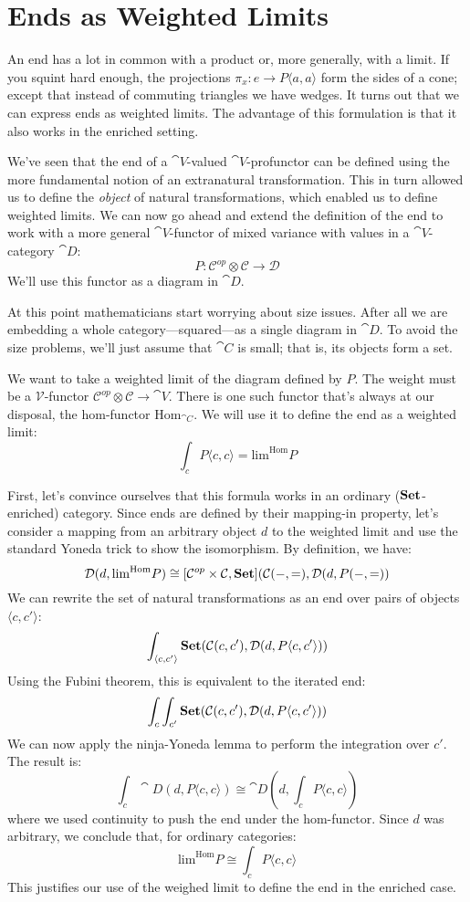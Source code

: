 \documentclass[DaoFP]{subfiles}
\begin{document}
\section{Ends as Weighted Limits}

An end has a lot in common with a product or, more generally, with a limit. If you squint hard enough, the projections $\pi_x \colon e \to P \langle a, a \rangle$ form the sides of a cone; except that instead of commuting triangles we have wedges. It turns out that we can express ends as weighted limits. The advantage of this formulation is that it also works in the enriched setting. 

We've seen that the end of a $\cat V$-valued $\cat V$-profunctor can be defined using the more fundamental notion of an extranatural transformation. This in turn allowed us to define the \emph{object} of natural transformations, which enabled us to define weighted limits. We can now go ahead and extend the definition of the end to work with a more general $\cat V$-functor of mixed variance with values in a $\cat V$-category $\cat D$:
\[ P \colon \mathcal C^{op} \otimes \mathcal C \to \mathcal D \]
We'll use this functor as a diagram in $\cat D$. 

At this point mathematicians start worrying about size issues. After all we are embedding a whole category---squared---as a single diagram in $\cat D$. To avoid the size problems, we'll just assume that $\cat C$ is small; that is, its objects form a set. 

We want to take a weighted limit of the diagram defined by $P$. The weight must be a $\mathcal V$-functor $\mathcal C^{op} \otimes \mathcal C \to \cat V$. There is one such functor that's always at our disposal, the hom-functor $\text{Hom}_{\cat C}$. We will use it to define the end as a weighted limit:
\[  \int_c P\langle c, c\rangle = \text{lim}^{\text{Hom}} P\]

First, let's convince ourselves that this formula works in an ordinary ($\mathbf{Set}$-enriched) category. Since ends are defined by their mapping-in property, let's consider a mapping from an arbitrary object $d$ to the weighted limit and use the standard Yoneda trick to show the isomorphism. By definition, we have:
\[ \mathcal{D}(d, \text{lim}^{\text{Hom}} P) \cong [\mathcal{C}^{op} \times \mathcal{C}, \mathbf{Set}](\mathcal{C}(-, =), \mathcal{D} (d, P(-, =))\]
We can rewrite the set of natural transformations as an end over pairs of objects $\langle c, c' \rangle$:
\[ \int_{\langle c, c' \rangle} \mathbf{Set}(\mathcal{C}(c, c'), \mathcal{D} (d, P\langle c, c' \rangle)) \]
Using the Fubini theorem, this is equivalent to the iterated end:
\[\int_c \int_{c'} \mathbf{Set}(\mathcal{C}(c, c'), \mathcal{D}(d, P\langle c, c' \rangle))\]
We can now apply the ninja-Yoneda lemma to perform the integration over $c'$. The result is:
\[ \int_c \cat D(d, P\langle c, c \rangle) \cong \cat D(d, \int_c P \langle c, c \rangle) \]
where we used continuity to push the end under the hom-functor. Since $d$ was arbitrary, we conclude that, for ordinary categories:
\[ \text{lim}^{\text{Hom}} P \cong  \int_c P\langle c, c\rangle \]
This justifies our use of the weighed limit to define the end in the enriched case.
\end{document}
